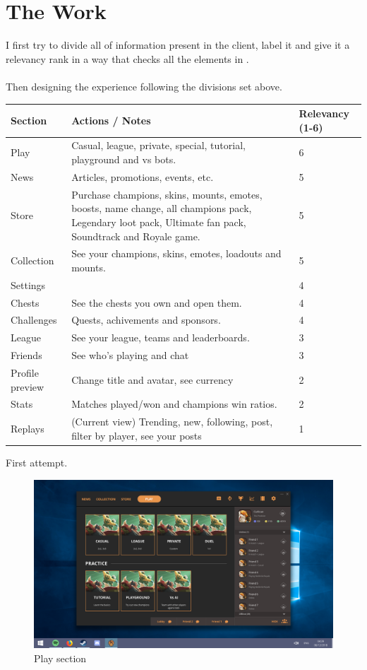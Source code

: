 \documentclass[a4paper,12pt]{article}
\begin{document}
\newpage
\section{The Work}
I first try to divide all of information present in the client, label it and give it a relevancy rank in a way that checks all the elements in .\\ \null \\
Then designing the experience following the divisions set above.

\def\arraystretch{1.8}
\begin{center}
    \begin{tabular}{ | p{4.3cm} | p{8.6cm} | l | }
    \hline
    \textbf{Section} 
    & \textbf{Actions / Notes}
    & \textbf{Relevancy (1-6)} 
    \\ \hline
    Play 
    & Casual, league, private, special, tutorial, playground and vs bots. 
    & 6
    \\ \hline
    News 
    & Articles, promotions, events, etc. 
    & 5
    \\ \hline
    Store 
    & Purchase champions, skins, mounts, emotes, boosts, name change, all champions pack, Legendary loot pack, Ultimate fan pack, Soundtrack and Royale game.
    & 5
    \\ \hline
    Collection 
    & See your champions, skins, emotes, loadouts and mounts. 
    & 5
    \\ \hline
    Settings 
    & 
    & 4
    \\ \hline
    Chests 
    & See the chests you own and open them. 
    & 4
    \\ \hline
    Challenges 
    & Quests, achivements and sponsors. 
    & 4
    \\ \hline
    League 
    & See your league, teams and leaderboards. 
    & 3
    \\ \hline
    Friends 
    & See who's playing and chat 
    & 3 
    \\ \hline
    Profile preview
    & Change title and avatar, see currency
    & 2
    \\ \hline
    Stats 
    & Matches played/won and champions win ratios. 
    & 2
    \\ \hline
    Replays 
    & (Current view) Trending, new, following, post, filter by player, see your posts
    & 1 
    \\ \hline
    \end{tabular}
\end{center}

\newpage
First attempt.
\begin{figure}[h!]
    \includegraphics[width=1\linewidth]{res/play.png}
    \centering
    \caption{Play section}
\end{figure}
\end{document}
